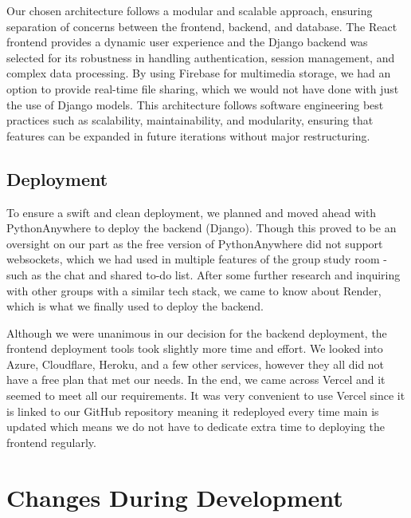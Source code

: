 Our chosen architecture follows a modular and scalable approach, ensuring separation of concerns between the frontend, backend, and database. The React frontend provides a dynamic user experience and the Django backend was selected for its robustness in handling authentication, session management, and complex data processing. By using Firebase for multimedia storage, we had an option to provide real-time file sharing, which we would not have done with just the use of Django models. This architecture follows software engineering best practices such as scalability, maintainability, and modularity, ensuring that features can be expanded in future iterations without major restructuring.


\subsection{Deployment}
To ensure a swift and clean deployment, we planned and moved ahead with PythonAnywhere to deploy the backend (Django). Though this proved to be an oversight on our part as the free version of PythonAnywhere did not support websockets, which we had used in multiple features of the group study room - such as the chat and shared to-do list. After some further research and inquiring with other groups with a similar tech stack, we came to know about Render, which is what we finally used to deploy the backend.

Although we were unanimous in our decision for the backend deployment, the frontend deployment tools took slightly more time and effort. We looked into Azure, Cloudflare, Heroku, and a few other services, however they all did not have a free plan that met our needs. In the end, we came across Vercel and it seemed to meet all our requirements. It was very convenient to use Vercel since it is linked to our GitHub repository meaning it redeployed every time main is updated which means we do not have to dedicate extra time to deploying the frontend regularly.

\section{Changes During Development}
\label{sect:changes-during-development}

